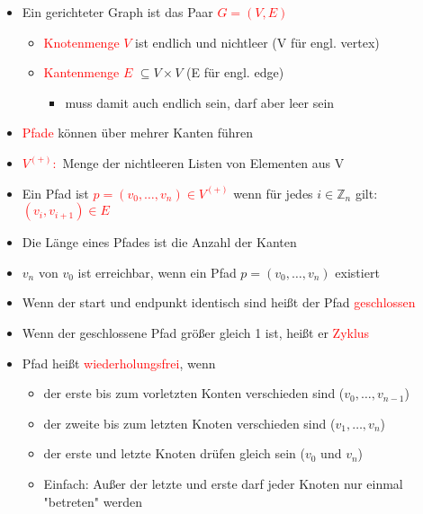 \documentclass[12pt]{article}
\begin{document}
\normalsize
\begin{flushleft}
    \vspace{0.5cm}
    \begin{itemize}
        \item Ein gerichteter Graph ist das Paar \textcolor{red}{$G = (V,E)$}
        \begin{itemize}
            \item \textcolor{red}{Knotenmenge $V$} ist endlich und nichtleer (V für engl. vertex)
            \item \textcolor{red}{Kantenmenge $E$} $\subseteq V \times V$  (E für engl. edge)
            \begin{itemize}
                \item muss damit auch endlich sein, darf aber leer sein
            \end{itemize}
        \end{itemize}
        \item \textcolor{red}{Pfade} können über mehrer Kanten führen
        \item \textcolor{red}{$V^{(+)}:$} Menge der nichtleeren Listen von Elementen aus V
        \item Ein Pfad ist \textcolor{red}{$p=(v_0,\dots ,v_n) \in V^{(+)}$} wenn für jedes $i \in \mathbb{Z}_n$ gilt: \textcolor{red}{$(v_i,v_{i+1})\in E$}
        \item Die Länge eines Pfades ist die Anzahl der Kanten
        \item $v_n$ von $v_0$ ist erreichbar, wenn ein Pfad $p = (v_0,\dots ,v_n)$ existiert
        \item Wenn der start und endpunkt identisch sind heißt der Pfad \textcolor{red}{geschlossen}
        \item Wenn der geschlossene Pfad größer gleich 1 ist, heißt er \textcolor{red}{Zyklus}
        \item Pfad heißt \textcolor{red}{wiederholungsfrei}, wenn
        \begin{itemize}
            \item der erste bis zum vorletzten Konten verschieden sind ($v_0,\dots ,v_{n-1}$)
            \item der zweite bis zum letzten Knoten verschieden sind ($v_1,\dots ,v_n$)
            \item der erste und letzte Knoten drüfen gleich sein ($v_0$ und $v_n$)
            \item Einfach: Außer der letzte und erste darf jeder Knoten nur einmal "betreten" werden
        \end{itemize}

\end{itemize}
\end{flushleft}
\end{document}
